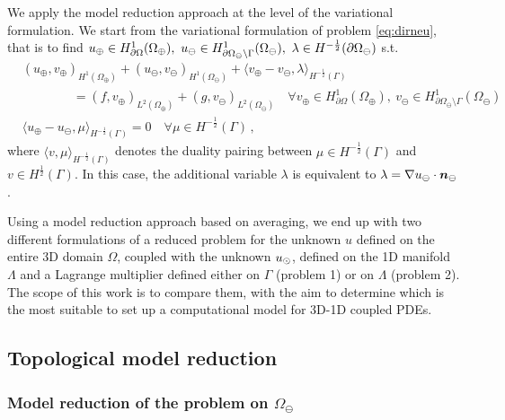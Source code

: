 \documentclass[r]{siamart171218}
\begin{document}
We apply the model reduction approach at the level of the variational formulation.
We start from the variational formulation of problem \eqref{eq:dirneu}, 
that is to find $\up \in H^1_{\partial\Omega}(\Omega_\oplus), \ \uf \in H^1_{\partial\Omega_\ominus\setminus\Gamma}(\Omega_\ominus), \ \lambda \in H^{-\frac12}(\partial\Omega_\ominus)$ s.t.
\begin{subequations}\label{eq:weak_dirneu}
\begin{align}
&(u_\oplus,v_\oplus)_{H^1(\Omega_\oplus)} + (u_\ominus,v_\ominus)_{H^1(\Omega_\ominus)} 
+ \langle  v_\oplus - v_\ominus, \lambda \rangle_{H^{-\frac12}(\Gamma)} 
\\
\nonumber
&\qquad\qquad = (f,v_\oplus)_{L^2(\Omega_\oplus)} + (g,v_\ominus)_{L^2(\Omega_\ominus)}
\quad \forall v_\oplus \in H^1_{\partial\Omega}(\Omega_\oplus), \ v_\ominus \in H^1_{\partial\Omega_\ominus\setminus\Gamma}(\Omega_\ominus)
\\
& \langle u_\oplus - u_\ominus, \mu \rangle_{H^{-\frac12}(\Gamma)} = 0
\quad \forall  \mu \in H^{-\frac12}(\Gamma)\,,
\end{align}
\end{subequations}
where $\langle v, \mu \rangle_{H^{-\frac12}(\Gamma)}$ denotes the duality pairing between 
$ \mu \in H^{-\frac12}(\Gamma)$ and $v \in H^{\frac12}(\Gamma)$.
In this case, the additional variable $\lambda$ is equivalent to $\lambda  =  \nabla u_{\ominus} \cdot \boldsymbol n_\ominus$.

Using a model reduction approach based on averaging, we end up with two different formulations of a reduced problem
for the unknown $u$ defined on the entire 3D domain $\Omega$, coupled with the unknown $u_{\odot}$, defined on the 1D manifold $\Lambda$
and a Lagrange multiplier defined either on $\Gamma$ (problem 1) or on $\Lambda$ (problem 2). 
The scope of this work is to compare them, with the aim to determine which is the most suitable to set up a computational model for 3D-1D coupled PDEs.


\subsection{Topological model reduction}
\subsubsection*{Model reduction of the problem on $\Omega_{\ominus}$}
\end{document}

